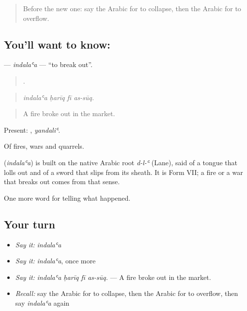 \label{lesson:AR-C316-indalaa}



\begin{quote}
Before the new one: say the Arabic for to collapse, then the Arabic for to overflow.
\end{quote}

\subsection*{You'll want to know: }
\textbf{} — \emph{indalaʿa} — \textquotedblleft{}to break out\textquotedblright{}.

\begin{quote}
   .
\end{quote}

\begin{quote}
\emph{indalaʿa ḥarīq fī as-sūq.}
\end{quote}

\begin{quote}
A fire broke out in the market.
\end{quote}

Present: , \emph{yandaliʿ}.

Of fires, wars and quarrels.

\begin{cousinweb}
\textbf{} (\emph{indalaʿa}) is built on the native Arabic root \emph{d-l-ʿ} (Lane), said of a tongue that lolls out and of a sword that slips from its sheath. It is Form VII; a fire or a war that breaks out comes from that sense.
\end{cousinweb}

\begin{grammarlens}[title={What you've built}]
One more word for telling what happened.
\end{grammarlens}

\subsection*{Your turn}
\begin{itemize}
\raggedright
  \item \emph{Say it:} \emph{indalaʿa}
  \item \emph{Say it:} \emph{indalaʿa}, once more
  \item \emph{Say it:} \emph{indalaʿa ḥarīq fī as-sūq.} — A fire broke out in the market.
  \item \emph{Recall:} say the Arabic for to collapse, then the Arabic for to overflow, then say \emph{indalaʿa} again
\end{itemize}

